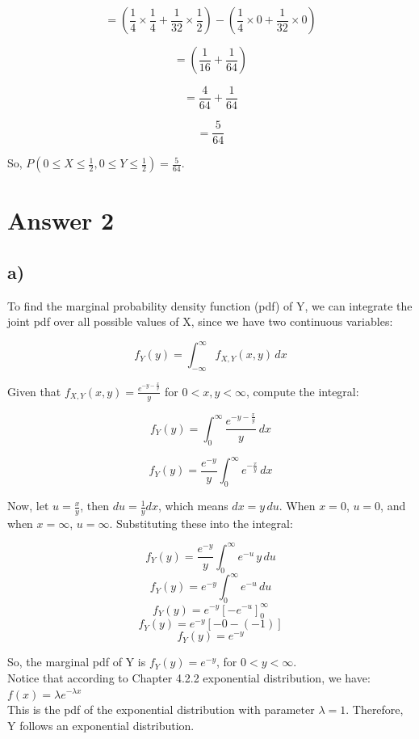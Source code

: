 \documentclass[12pt]{article}
\begin{document}
\[
= \left( \frac{1}{4} \times \frac{1}{4} + \frac{1}{32} \times \frac{1}{2} \right) - \left( \frac{1}{4} \times 0 + \frac{1}{32} \times 0 \right)
\]

\[
= \left( \frac{1}{16} + \frac{1}{64} \right)
\]

\[
= \frac{4}{64} + \frac{1}{64}
\]

\[
= \frac{5}{64}
\]

So, \( P(0 \leq X \leq \frac{1}{2}, 0 \leq Y \leq \frac{1}{2}) = \frac{5}{64} \).

\section*{Answer 2}
\subsection*{a)} 

To find the marginal probability density function (pdf) of Y, we can integrate the joint pdf over all possible values of X, since we have two continuous variables:

\[ f_Y(y) = \int_{-\infty}^{\infty} f_{X,Y}(x, y) \, dx \]

Given that \( f_{X,Y}(x, y) = \frac{e^{-y - \frac{x}{y}}}{y} \) for \( 0 < x, y < \infty \), compute the integral:

\[ f_Y(y) = \int_{0}^{\infty} \frac{e^{-y - \frac{x}{y}}}{y} \, dx \]

\[ f_Y(y) = \frac{e^{-y}}{y} \int_{0}^{\infty} e^{-\frac{x}{y}} \, dx \]

Now, let \( u = \frac{x}{y} \), then \( du = \frac{1}{y} dx \), which means \( dx = y \, du \). When \( x = 0 \), \( u = 0 \), and when \( x = \infty \), \( u = \infty \). Substituting these into the integral:

\[ f_Y(y) = \frac{e^{-y}}{y} \int_{0}^{\infty} e^{-u} \, y \, du \]
\[ f_Y(y) = e^{-y} \int_{0}^{\infty} e^{-u} \, du \]
\[ f_Y(y) = e^{-y} [-e^{-u}]_{0}^{\infty} \]
\[ f_Y(y) = e^{-y} [-0 - (-1)] \]
\[ f_Y(y) = e^{-y} \]

So, the marginal pdf of Y is \( f_Y(y) = e^{-y} \), for \( 0 < y < \infty \). \\
Notice that according to Chapter 4.2.2 exponential distribution, we have:
\( f(x) = \lambda e^{-\lambda x } \) \\

This is the pdf of the exponential distribution with parameter \( \lambda = 1 \). Therefore, Y follows an exponential distribution.
\end{document}
